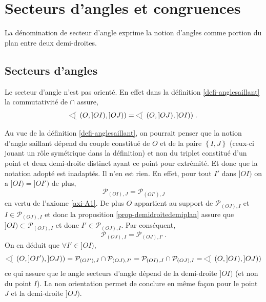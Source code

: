     \section{Secteurs d'angles et congruences}\label{subsec_secang}

La dénomination de secteur d'angle exprime la notion d'angles comme portion du plan entre deux demi-droites. 
        
        \subsection{Secteurs d'angles}

\begin{rema}
    Le secteur d'angle n'est pas orienté. En effet dans la définition \ref{defi-anglesaillant} la commutativité de $\cap$ assure,
    \begin{equation*}
       \anglesaillant \left({O},{]OI)},{]OJ)}\right) = \anglesaillant \left({O},{]OJ)},{]OI)}\right)\,.
    \end{equation*}  
\end{rema}

\begin{rema}
    Au vue de la définition \ref{defi-anglesaillant}, on pourrait penser que la notion d'angle saillant dépend du couple constitué de $O$ et de la paire $\left\{I,J\right\}$ (ceux-ci jouant un rôle symétrique dans la définition) et non du triplet constitué d'un point et deux demi-droite distinct ayant ce point pour extrémité. Et donc que la notation adopté est inadaptés. Il n'en est rien. En effet, pour tout $I'$ dans $]OI)$ on a $]OI)=]OI')$ de plus,
    $$\mathcal{P}_{(OI),J} = \mathcal{P}_{(OI'),J}$$
    en vertu de l'axiome \ref{axi-A1}. De plus $O$ appartient au support de $\mathcal{P}_{(OJ),I}$ et $I\in \mathcal{P}_{(OJ),I}$ et donc la proposition \ref{prop-demidroitedemiplan} assure que $]OI)\subset \mathcal{P}_{(OJ),I}$ et donc $I'\in \mathcal{P}_{(OJ),I}$. Par conséquent, $$\mathcal{P}_{(OJ),I}=\mathcal{P}_{(OJ),I'}\,.$$ On en déduit que $\forall I'\in ]OI)$,
    \begin{equation*}
        \anglesaillant \left({O},{]OI')},{]OJ)}\right) = \mathcal{P}_{(OI'),J}\cap\mathcal{P}_{(OJ),I'}= \mathcal{P}_{(OI),J}\cap\mathcal{P}_{(OJ),I}=\anglesaillant \left({O},{]OI)},{]OJ)}\right)
    \end{equation*}
    ce qui assure que le angle secteurs d'angle dépend de la demi-droite $]OI)$ (et non du point $I$). La non orientation permet de conclure en même façon pour le point $J$ et la demi-droite $]OJ)$. 
\end{rema}

